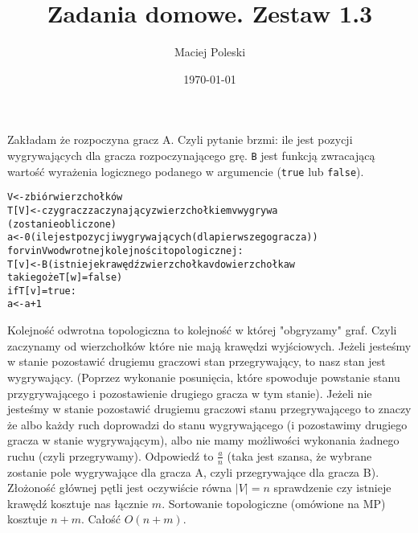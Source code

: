 \documentclass[a4paper,12pt]{article}
\title{Zadania domowe. Zestaw 1.3}
\author{Maciej Poleski}
\date{\today}
\begin{document}
\maketitle

\newpage

\section{}
Zakładam że rozpoczyna gracz A. Czyli pytanie brzmi: ile jest pozycji wygrywających dla gracza rozpoczynającego grę. \verb|B| jest funkcją zwracającą wartość wyrażenia logicznego podanego w argumencie (\verb|true| lub \verb|false|).
\begin{alltt}
V <- zbiór wierzchołków
T[V] <- czy gracz zaczynający z wierzchołkiem v wygrywa
            (zostanie obliczone)
a <- 0 (ile jest pozycji wygrywających (dla pierwszego gracza))
for v in V w odwrotnej kolejności topologicznej:
    T[v] <- B(istnieje krawędź z wierzchołka v do wierzchołka w 
                takiego że T[w] = false)
    if T[v] = true:
        a <- a + 1

\end{alltt}
 Kolejność odwrotna topologiczna to kolejność w której "obgryzamy" graf. Czyli zaczynamy od wierzchołków które nie mają krawędzi wyjściowych. Jeżeli jesteśmy w stanie pozostawić drugiemu graczowi stan przegrywający, to nasz stan jest wygrywający. (Poprzez wykonanie posunięcia, które spowoduje powstanie stanu przygrywającego i pozostawienie drugiego gracza w tym stanie). Jeżeli nie jesteśmy w stanie pozostawić drugiemu graczowi stanu przegrywającego to znaczy że albo każdy ruch doprowadzi do stanu wygrywającego (i pozostawimy drugiego gracza w stanie wygrywającym), albo nie mamy możliwości wykonania żadnego ruchu (czyli przegrywamy). Odpowiedź to $\frac{a}{n}$ (taka jest szansa, że wybrane zostanie pole wygrywające dla gracza A, czyli przegrywające dla gracza B). Złożoność głównej pętli jest oczywiście równa $|V|=n$ sprawdzenie czy istnieje krawędź kosztuje nas łącznie $m$. Sortowanie topologiczne (omówione na MP) kosztuje $n+m$. Całość $O(n+m)$.
\section{}
\end{document}
